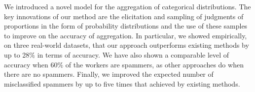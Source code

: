 \documentclass{article}
\begin{document}
\label{sec:5-Conclusions}

We introduced a novel model for the aggregation of categorical distributions.
The key innovations of our method are the elicitation and sampling
of judgments of proportions in the form of probability distributions
and the use of these samples to improve on the accuracy of aggregation.
In particular, we showed empirically, on three real-world datasets,
that our approach outperforms existing methods by up to 28\% in terms
of accuracy. We have also shown a comparable level of accuracy when
60\% of the workers are spammers, as other approaches do when there
are no spammers. Finally, we improved the expected number of misclassified
spammers by up to five times that achieved by existing methods. 
 



\end{document}
